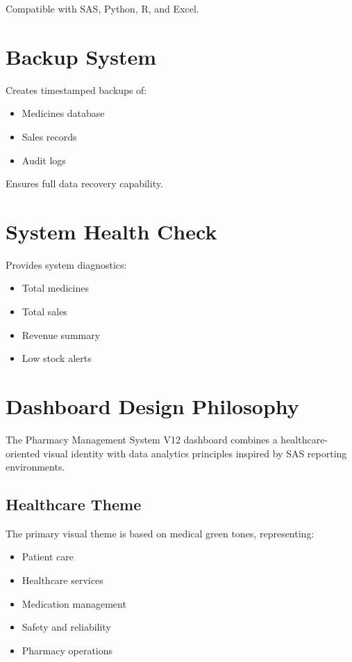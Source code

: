 \documentclass[12pt,a4paper]{article}
\begin{document}
Compatible with SAS, Python, R, and Excel.

\section{Backup System}

Creates timestamped backups of:

\begin{itemize}
\item Medicines database
\item Sales records
\item Audit logs
\end{itemize}

Ensures full data recovery capability.

\section{System Health Check}

Provides system diagnostics:

\begin{itemize}
\item Total medicines
\item Total sales
\item Revenue summary
\item Low stock alerts
\end{itemize}




\section*{Dashboard Design Philosophy}

The Pharmacy Management System V12 dashboard combines a healthcare-oriented visual identity with data analytics principles inspired by SAS reporting environments.

\subsection*{Healthcare Theme}

The primary visual theme is based on medical green tones, representing:

\begin{itemize}
\item Patient care
\item Healthcare services
\item Medication management
\item Safety and reliability
\item Pharmacy operations
\end{itemize}
\end{document}
